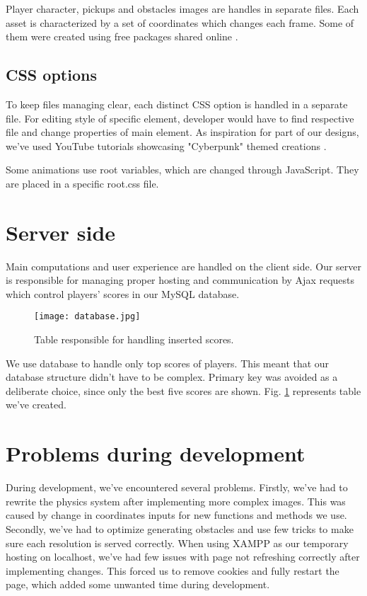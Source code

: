 \documentclass[oneside,a4paper,11pt]{report}
\begin{document}
\par
Player character, pickups and obstacles images are handles in separate files. Each asset is characterized by a set of coordinates which changes each frame. Some of them were created using free packages shared online \cite{Facade009} \cite{Kitbash}.

\subsection{CSS options}
To keep files managing clear, each distinct CSS option is handled in a separate file. For editing style of specific element, developer would have to find respective file and change properties of main element. As inspiration for part of our designs, we've used YouTube tutorials showcasing "Cyberpunk" themed creations \cite{CyberpunkCSS} \cite{GlitchCSS}.

\par
Some animations use root variables, which are changed through JavaScript. They are placed in a specific root.css file.

\section{Server side}
Main computations and user experience are handled on the client side. Our server is responsible for managing proper hosting and communication by Ajax requests which control players' scores in our MySQL database.

\begin{figure}[!htb]
	\centering
	\texttt{[image: database.jpg]}
	\caption{Table responsible for handling inserted scores.\label{fig:database}}
\end{figure}

\par
We use database to handle only top scores of players. This meant that our database structure didn't have to be complex. Primary key was avoided as a deliberate choice, since only the best five scores are shown. Fig. \ref{fig:database} represents table we've created.

\section{Problems during development}
During development, we've encountered several problems. Firstly, we've had to rewrite the physics system after implementing more complex images. This was caused by change in coordinates inputs for new functions and methods we use. Secondly, we've had to optimize generating obstacles and use few tricks to make sure each resolution is served correctly. When using XAMPP as our temporary hosting on localhost, we've had few issues with page not refreshing correctly after implementing changes. This forced us to remove cookies and fully restart the page, which added some unwanted time during development.
\end{document}
